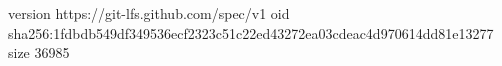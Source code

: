 version https://git-lfs.github.com/spec/v1
oid sha256:1fdbdb549df349536ecf2323c51c22ed43272ea03cdeac4d970614dd81e13277
size 36985
